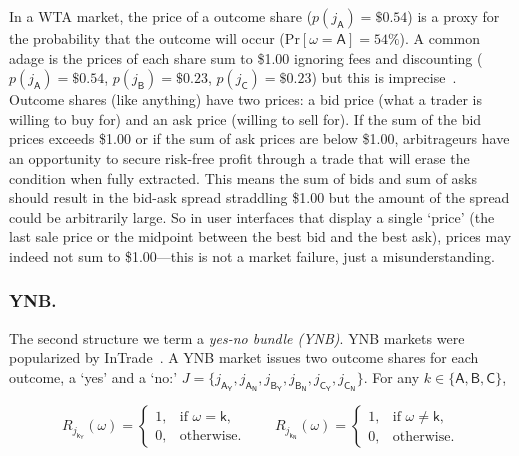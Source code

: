 In a WTA market, the price of a outcome share (\eg $p(j_\mathsf{A})=\$0.54$) is a proxy for the probability that the outcome will occur (\eg $\mathrm{Pr}[\omega=\mathsf{A}]=54\%$). A common adage is the prices of each share sum to \$1.00 ignoring fees and discounting (\eg $p(j_\mathsf{A})=\$0.54$, $p(j_\mathsf{B})=\$0.23$, $p(j_\mathsf{C})=\$0.23$) but this is imprecise~\cite{BCFKMN14}. Outcome shares (like anything) have two prices: a bid price (what a trader is willing to buy for) and an ask price (willing to sell for). If the sum of the bid prices exceeds \$1.00 or if the sum of ask prices are below \$1.00, arbitrageurs have an opportunity to secure risk-free profit through a trade that will erase the condition when fully extracted. This means the sum of bids and sum of asks should result in the bid-ask spread straddling \$1.00 but the amount of the spread could be arbitrarily large. So in user interfaces that display a single `price' (\eg the last sale price or the midpoint between the best bid and the best ask), prices may indeed not sum to \$1.00---this is not a market failure, just a misunderstanding.  

 
 \subsubsection{YNB.}
 
The second structure we term a \textit{yes-no bundle (YNB)}. YNB markets were popularized by InTrade~\cite{intrade}. A YNB market issues two outcome shares for each outcome, a `yes' and a `no:'  $J=\{j_{\mathsf{A_Y}}, j_{\mathsf{A_N}}, j_{\mathsf{B_Y}}, j_{\mathsf{B_N}}, j_{\mathsf{C_Y}},j_{\mathsf{C_N}} \}$. For any $k\in\{\mathsf{A},\mathsf{B},\mathsf{C}\}$,

\begin{equation}
R_{j_{\mathsf{k_Y}}}(\omega)=
\begin{cases}
1, & \text{if } \omega=\mathsf{k},\\
0, & \text{otherwise.}
\end{cases}
\qquad
R_{j_{\mathsf{k_N}}}(\omega)=
\begin{cases}
1, & \text{if } \omega\neq\mathsf{k},\\
0, & \text{otherwise.}
\end{cases}
\end{equation}

